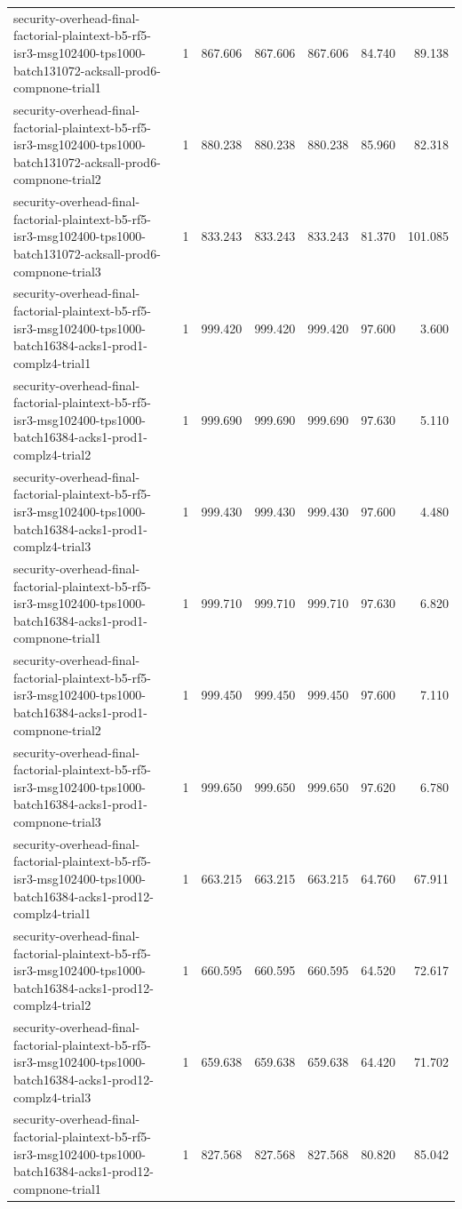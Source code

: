 \begin{tabular}{lrrrrrr}
security-overhead-final-factorial-plaintext-b5-rf5-isr3-msg102400-tps1000-batch131072-acksall-prod6-compnone-trial1 & 1 & 867.606 & 867.606 & 867.606 & 84.740 & 89.138 \\
security-overhead-final-factorial-plaintext-b5-rf5-isr3-msg102400-tps1000-batch131072-acksall-prod6-compnone-trial2 & 1 & 880.238 & 880.238 & 880.238 & 85.960 & 82.318 \\
security-overhead-final-factorial-plaintext-b5-rf5-isr3-msg102400-tps1000-batch131072-acksall-prod6-compnone-trial3 & 1 & 833.243 & 833.243 & 833.243 & 81.370 & 101.085 \\
security-overhead-final-factorial-plaintext-b5-rf5-isr3-msg102400-tps1000-batch16384-acks1-prod1-complz4-trial1 & 1 & 999.420 & 999.420 & 999.420 & 97.600 & 3.600 \\
security-overhead-final-factorial-plaintext-b5-rf5-isr3-msg102400-tps1000-batch16384-acks1-prod1-complz4-trial2 & 1 & 999.690 & 999.690 & 999.690 & 97.630 & 5.110 \\
security-overhead-final-factorial-plaintext-b5-rf5-isr3-msg102400-tps1000-batch16384-acks1-prod1-complz4-trial3 & 1 & 999.430 & 999.430 & 999.430 & 97.600 & 4.480 \\
security-overhead-final-factorial-plaintext-b5-rf5-isr3-msg102400-tps1000-batch16384-acks1-prod1-compnone-trial1 & 1 & 999.710 & 999.710 & 999.710 & 97.630 & 6.820 \\
security-overhead-final-factorial-plaintext-b5-rf5-isr3-msg102400-tps1000-batch16384-acks1-prod1-compnone-trial2 & 1 & 999.450 & 999.450 & 999.450 & 97.600 & 7.110 \\
security-overhead-final-factorial-plaintext-b5-rf5-isr3-msg102400-tps1000-batch16384-acks1-prod1-compnone-trial3 & 1 & 999.650 & 999.650 & 999.650 & 97.620 & 6.780 \\
security-overhead-final-factorial-plaintext-b5-rf5-isr3-msg102400-tps1000-batch16384-acks1-prod12-complz4-trial1 & 1 & 663.215 & 663.215 & 663.215 & 64.760 & 67.911 \\
security-overhead-final-factorial-plaintext-b5-rf5-isr3-msg102400-tps1000-batch16384-acks1-prod12-complz4-trial2 & 1 & 660.595 & 660.595 & 660.595 & 64.520 & 72.617 \\
security-overhead-final-factorial-plaintext-b5-rf5-isr3-msg102400-tps1000-batch16384-acks1-prod12-complz4-trial3 & 1 & 659.638 & 659.638 & 659.638 & 64.420 & 71.702 \\
security-overhead-final-factorial-plaintext-b5-rf5-isr3-msg102400-tps1000-batch16384-acks1-prod12-compnone-trial1 & 1 & 827.568 & 827.568 & 827.568 & 80.820 & 85.042 \\

\end{tabular}

